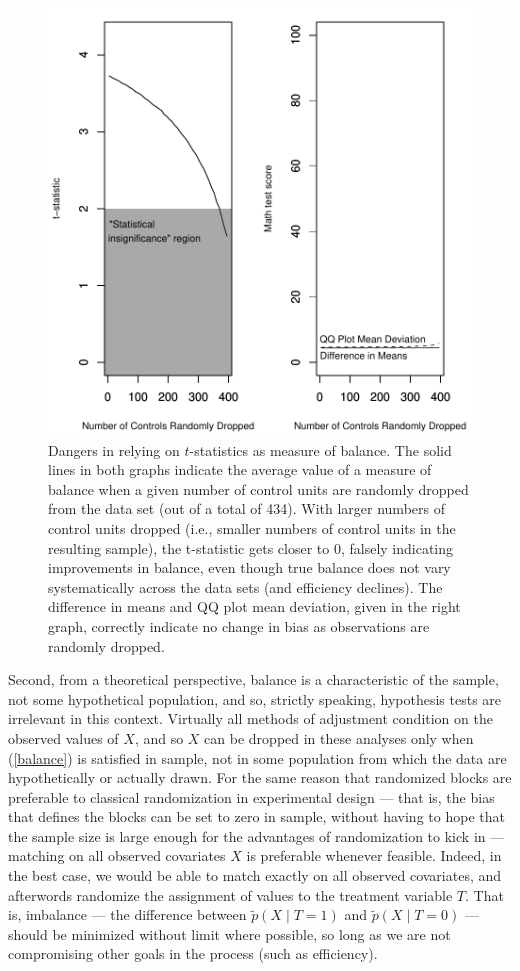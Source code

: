 \documentclass[11pt,titlepage]{article}
\begin{document}
\begin{figure}[t]
  \centering
  \includegraphics[height=4.5in]{figs/TStatPlotR0MATH}
  \caption{Dangers in relying on $t$-statistics as measure of balance.
    The solid lines in both graphs indicate the average value of a
    measure of balance when a given number of control units are
    randomly dropped from the data set (out of a total of 434).  With
    larger numbers of control units dropped (i.e., smaller numbers of
    control units in the resulting sample), the t-statistic gets
    closer to 0, falsely indicating improvements in balance, even
    though true balance does not vary systematically across the data
    sets (and efficiency declines).  The difference in means and QQ
    plot mean deviation, given in the right graph, correctly indicate
    no change in bias as observations are randomly dropped.}
  \label{f:randrop}
\end{figure}

Second, from a theoretical perspective, balance is a characteristic of
the sample, not some hypothetical population, and so, strictly speaking,
hypothesis tests are irrelevant in this context.  Virtually all
methods of adjustment condition on the observed values of $X$, and so
$X$ can be dropped in these analyses only when (\ref{balance}) is
satisfied in sample, not in some population from which the data are
hypothetically or actually drawn.  For the same reason that randomized
blocks are preferable to classical randomization in experimental
design --- that is, the bias that defines the blocks can be set to
zero in sample, without having to hope that the sample size is large
enough for the advantages of randomization to kick in --- matching on
all observed covariates $X$ is preferable whenever feasible.  Indeed, in the best
case, we would be able to match exactly on all observed covariates, and
afterwords randomize the assignment of values to the treatment
variable $T$.  That is, imbalance --- the difference between $\tilde
p(X\mid T=1)$ and $\tilde p(X\mid T=0)$ --- should be minimized
without limit where possible, so long as we are not compromising other
goals in the process (such as efficiency).
\end{document}
